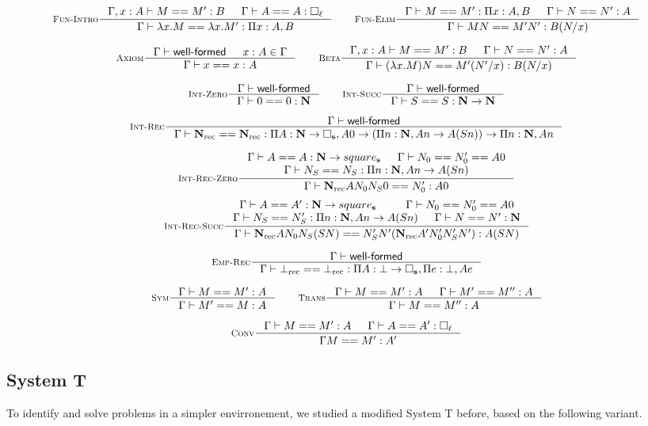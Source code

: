 \documentclass{article}
\DeclareMathOperator{\rec}{rec}
\newcommand{\0}{\mathbf{0}}
\newcommand{\1}{\mathbf{1}}
\newcommand{\nat}{\mathbf{N}}
\newcommand{\Wf}{\textsf{well-formed}}
\newcommand{\slvl}{\mathbf{s}}
\begin{document}
$$
    \inference[\textsc{Fun-Intro}]{\Gamma, x : A |- M == M' : B &\Gamma |- A == A : \square_\ell}{\Gamma |- \lambda x. M == \lambda x. M' : \Pi x : A, B} \qquad
    \inference[\textsc{Fun-Elim}]{\Gamma |- M == M' : \Pi x:A, B& \Gamma |- N == N' : A}{\Gamma |- MN == M'N' : B(N/x)}
$$

$$
    \inference[\textsc{Axiom}]{\Gamma |- \Wf & x : A \in \Gamma }{\Gamma |- x == x : A} \qquad
    \inference[\textsc{Beta}]{\Gamma, x : A |- M == M' : B & \Gamma |- N == N' : A}{\Gamma |- (\lambda x. M)N == M'(N'/x) : B(N/x)}
$$

$$
    \inference[\textsc{Int-Zero}]{\Gamma |- \Wf}{\Gamma |- 0 == 0 : \nat} \qquad
    \inference[\textsc{Int-Succ}]{\Gamma |- \Wf}{\Gamma |- S == S : \nat -> \nat}
$$

$$
    \inference[\textsc{Int-Rec}]{\Gamma |- \Wf}{\Gamma |- \nat_{\rec} == \nat_{\rec} : \Pi A : \nat \to \square_\slvl, A 0 \to \left(\Pi n:\nat, A n \to A (S n)\right) \to \Pi n :\nat, A n}
$$


$$
    \inference[\textsc{Int-Rec-Zero}]{\Gamma |- A == A : \nat -> square_\slvl & \Gamma |- N_0 == N'_0 == A 0\\ \Gamma |- N_S == N_S : \Pi n:\nat, A n -> A(S n)}{\Gamma |- \nat_{\rec} A N_0N_S0 == N'_0 : A 0}
$$
$$
    \inference[\textsc{Int-Rec-Succ}]{\Gamma |- A == A' : \nat -> square_\slvl & \Gamma |- N_0 == N'_0 == A 0\\ \Gamma |- N_S == N'_S : \Pi n:\nat, A n -> A(S n) & \Gamma |- N == N' :\nat}{\Gamma |- \nat_{\rec} A N_0N_S (S N) == N'_S N' (\nat_{\rec}A' N'_0 N'_S N') : A (S N)}
$$


$$
    \inference[\textsc{Emp-Rec}]{\Gamma |- \Wf}{\Gamma |- \bot_{\rec} == \bot_{\rec} : \Pi A : \bot \to \square_\slvl,\Pi e :\bot, A e}
$$

$$
    \inference[\textsc{Sym}]{\Gamma |- M == M' : A}{\Gamma |- M' == M : A} \qquad
    \inference[\textsc{Trans}]
    {\Gamma |- M == M' :A & \Gamma |- M' == M'' : A}{\Gamma |- M == M'' : A}
$$

$$
    \inference[\textsc{Conv}]
    {\Gamma |- M == M' :A & \Gamma |- A == A' : \square_\ell}{\Gamma M ==M' : A'}
$$

\subsection{System T}

To identify and solve problems in a simpler envirronement, we studied a modified System T before, based on the following variant.
\end{document}
